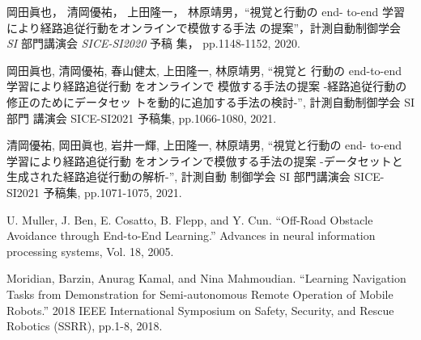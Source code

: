 \documentclass{jarticle}
\begin{document}
\footnotesize
\begin{thebibliography}{99}

岡田眞也， 清岡優祐， 上田隆一， 林原靖男，“視覚と行動の end-
to-end 学習により経路追従行動をオンラインで模倣する手法
の提案”，計測自動制御学会 \textit{SI} 部門講演会 \textit{SICE-SI2020} 予稿
集， pp.1148-1152, 2020.

岡田眞也, 清岡優祐, 春山健太, 上田隆一, 林原靖男, “視覚と
行動の end-to-end 学習により経路追従行動 をオンラインで
模倣する手法の提案 -経路追従行動の修正のためにデータセッ
トを動的に追加する手法の検討-”, 計測自動制御学会 SI 部門
講演会 SICE-SI2021 予稿集, pp.1066-1080, 2021.

清岡優祐, 岡田眞也, 岩井一輝, 上田隆一, 林原靖男, “視覚と行動の end-
to-end 学習により経路追従行動 をオンラインで模倣する手法の提案 -データセットと
生成された経路追従行動の解析-”, 計測自動 制御学会 SI 部門講演会 SICE-SI2021 
予稿集, pp.1071-1075, 2021.

U. Muller, J. Ben, E. Cosatto, B. Flepp, and Y. Cun.
“Off-Road Obstacle Avoidance through End-to-End Learning.”
Advances in neural information processing systems,
Vol. 18, 2005.

Moridian, Barzin, Anurag Kamal, and Nina Mahmoudian. 
“Learning Navigation Tasks from Demonstration for Semi-autonomous Remote
Operation of Mobile Robots.” 2018 IEEE International Symposium on
Safety, Security, and Rescue Robotics (SSRR), pp.1-8, 2018.

\end{thebibliography}

\normalsize
\end{document}

